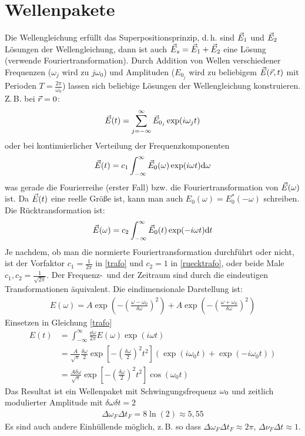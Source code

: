 \section{Wellenpakete}
Die Wellengleichung erfüllt das Superpositionsprinzip, d.\,h. 
sind $\vec{E}_1$ und $\vec{E}_2$ Lösungen der Wellengleichung, dann ist
auch $\vec{E}_s=\vec{E}_1+\vec{E}_2$ eine Lösung (verwende
Fouriertransformation).
Durch Addition von Wellen verschiedener Frequenzen ($\omega_j$ wird zu
$j\omega_0$) und Amplituden ($E_{0_j}$ wird zu beliebigem
$\vec{E}(\vec{r},t)$ mit Perioden $T=\frac{2\pi}{\omega_0}$) lassen sich
beliebige Lösungen der Wellengleichung konstruieren. Z.\,B. bei
$\vec{r}=0$:
\begin{gather*}
  \vec{E}(t)= \sum_{j=-\infty}^{\infty}
  \vec{E}_{0_j}\exp(i\omega_j t)
\end{gather*}
oder bei kontinuierlicher Verteilung der Frequenzkomponenten
\begin{gather}
  \vec{E}(t)= c_1\int_{-\infty}^{\infty}\vec{E}_{0}(\omega)\exp(i\omega t)\mathrm{d} \omega
  \label{trafo}
\end{gather}
was gerade die Fourierreihe (erster Fall) bzw. die
Fouriertransformation von $\vec{E}(\omega)$ ist. 
Da $\vec{E}(t)$ eine reelle Größe ist, kann man auch $E_0(\omega)=
E_0^*(-\omega)$ schreiben. Die Rücktransformation ist:
\begin{gather}
  \vec{E}(\omega) = c_2\int_{-\infty}^{\infty}
  \vec{E}_{0}(t)\exp(-i\omega t)\mathrm{d} t
  \label{ruecktrafo}
\end{gather}
Je nachdem, ob man die normierte Fouriertransformation durchführt oder
nicht, ist der Vorfaktor $c_1=\frac{1}{2\pi}$ in \eqref{trafo} und 
$c_2=1$ in \eqref{ruecktrafo}, oder beide Male $c_1,c_2=\frac{1}{\sqrt{2\pi}}$.
Der Frequenz-~und der Zeitraum sind durch die eindeutigen
Transformationen äquivalent. Die eindimensionale Darstellung ist:
\begin{align}
  E(\omega) = A\exp\left(-\left(
  \frac{\omega-\omega_0}{\delta \omega}
  \right)^2\right)
  + A \exp\left(-\left(
  \frac{\omega+\omega_0}{\delta \omega}
  \right)^2\right)
\end{align}
Einsetzen in Gleichung \eqref{trafo}
\begin{align*}
  E(t)&= \int_{-\infty}^{\infty}
        \frac{\dd\omega}{2\pi} E(\omega)\exp(i\omega t) \\
      &= \frac{A}{\sqrt{\pi}}\frac{\delta\omega}{2}\exp\left[
        -\left( \frac{\delta\omega}{2} \right)^2 t^2
        \right]
        \left( \exp(i\omega_0 t) + \exp(-i\omega_0 t) \right)\\
      &=\frac{A\delta\omega}{\sqrt{\pi}}
        \exp\left[
        -\left(\frac{\delta\omega}{2}\right)^2 t^2
        \right]
        \cos(\omega_0t)
\end{align*}
Das Resultat ist ein Wellenpaket mit Schwingungsfrequenz $\omega_0$ und
zeitlich modulierter Amplitude mit $\delta\omega\delta t=2$ 
\begin{align*}
  \Delta\omega_F\Delta t_F=8\ln(2)\approx5,55
\end{align*}
Es sind auch andere Einhüllende möglich, z.\,B. so dass $\Delta\omega_F\Delta
t_F\approx2\pi$, $\Delta\nu_F\Delta t\approx 1$.


